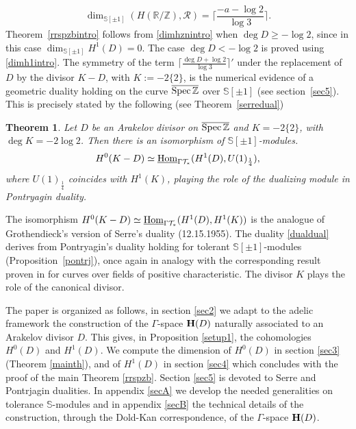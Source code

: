 \documentclass[cupthm]{CUP-JNL-JMJ}
\numberwithin{equation}{section}
\theoremstyle{cupplain}
\newtheorem{theorem}{Theorem}[section]
\theoremstyle{cupdefinition}
\theoremstyle{cupremark}
\theoremstyle{cupproof}
\def\R{{\mathbb R}}
\def\S{{\mathbb S}}
\def\Z{{\mathbb Z}}
\def\cR{{\mathcal R}}
\def\cT{{\mathcal T}}
\def\bfh{{\bf H}}
\def\Spec{{\rm Spec\,}}
\def\sss{{\S}}
\def\spm{{\sss[\pm 1]}}
\def\Hom {{\rm{Hom}}}
\def\spzb{{\overline{\Spec\Z}}}
\def\uhom{{\underline \Hom}}
\begin{document}
 \begin{equation}\label{dimh1intro}
\dim_{\spm}(H(\R/\Z),\cR)=\bigg\lceil \frac{-a- \log 2}{\log 3}\bigg\rceil.	
\end{equation}
Theorem~\ref{rrspzbintro}    follows from  \eqref{dimhznintro} when  $\deg D \geq -\log 2$, since in this case $\dim_{\spm}H^1(D)=0$. The case $\deg D<-\log 2$ is proved using \eqref{dimh1intro}.
The symmetry of the term  $\lceil \frac{\deg D+ \log 2}{\log 3}\rceil'$ under the replacement of  $D$ by the divisor $K-D$, with $K:=-2 \{2\}$, is the numerical evidence of a geometric duality holding on the curve $\spzb$ over $\spm$ (see section~\ref{sec5}). This is   precisely stated by the following  (see Theorem~\ref{serredual})
\begin{theorem}\label{serredualintro}
Let $D$ be an Arakelov divisor on $\spzb$ and $K=-2 \{2\}$, with $\deg K=-2 \log 2$. Then there is an isomorphism of $\spm$-modules.
\begin{equation}\label{dualdual}
H^0(K-D)\simeq \uhom_{\Gamma\cT_*}(H^1(D),U(1)_{\frac 14}),
\end{equation}
where $U(1)_{\frac 14}$ coincides with $H^1(K)$,  playing the role of the dualizing module in Pontryagin duality.
\end{theorem}
\noindent The isomorphism $H^0(K-D)\simeq \uhom_{\Gamma\cT_*}(H^1(D),H^1(K))$ is the analogue of Grothendieck's version of Serre's duality \cite{GS} (12.15.1955).
The duality  \eqref{dualdual} derives from   Pontryagin's duality holding for tolerant $\spm$-modules  (Proposition~\ref{pontrj}), once again in analogy with   the corresponding result proven in \cite{Weil39} for curves over  fields of positive characteristic. The divisor $K$ plays the role of the canonical divisor.

The paper is organized as follows, in section \ref{sec2} we adapt to the adelic framework the construction of the $\Gamma$-space $\bfh(D)$   naturally associated to an Arakelov divisor $D$. This gives, in Proposition \ref{setup1}, the cohomologies $H^0(D)$ and $H^1(D)$. We compute the dimension of $H^0(D)$  in section \ref{sec3} (Theorem \ref{mainth}), and of $H^1(D)$ in section \ref{sec4} which concludes with the proof of the main Theorem \ref{rrspzb}. Section \ref{sec5} is devoted to Serre and Pontrjagin dualities. In appendix \ref{secA} we develop the needed generalities on tolerance $\sss$-modules and in appendix \ref{secB} the technical details of the  construction, through the Dold-Kan correspondence, of the  $\Gamma$-space $\bfh(D)$.
\end{document}
